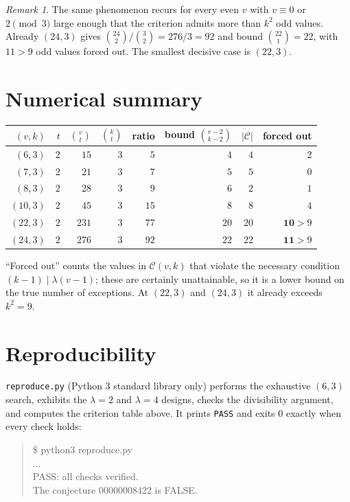 \documentclass[11pt]{article}
\theoremstyle{definition}
\theoremstyle{remark}
\newtheorem{remark}[theorem]{Remark}
\begin{document}
\begin{remark}
The same phenomenon recurs for every even $v$ with $v\equiv 0$ or $2\pmod 3$
large enough that the criterion admits more than $k^{2}$ odd values. Already
$(24,3)$ gives $\binom{24}{2}/\binom{3}{2}=276/3=92$ and bound
$\binom{22}{1}=22$, with $11>9$ odd values forced out. The smallest decisive
case is $(22,3)$.
\end{remark}

\section{Numerical summary}

\begin{center}
\begin{tabular}{r r r r r r r r}
\toprule
$(v,k)$ & $t$ & $\binom{v}{t}$ & $\binom{k}{t}$ & ratio & bound
$\binom{v-2}{k-2}$ & $|\mathcal C|$ & forced out \\
\midrule
$(6,3)$  & $2$ & $15$  & $3$ & $5$  & $4$  & $4$  & $2$ \\
$(7,3)$  & $2$ & $21$  & $3$ & $7$  & $5$  & $5$  & $0$ \\
$(8,3)$  & $2$ & $28$  & $3$ & $9$  & $6$  & $2$  & $1$ \\
$(10,3)$ & $2$ & $45$  & $3$ & $15$ & $8$  & $8$  & $4$ \\
$(22,3)$ & $2$ & $231$ & $3$ & $77$ & $20$ & $20$ & $\mathbf{10}>9$ \\
$(24,3)$ & $2$ & $276$ & $3$ & $92$ & $22$ & $22$ & $\mathbf{11}>9$ \\
\bottomrule
\end{tabular}
\end{center}

``Forced out'' counts the values in $\mathcal C(v,k)$ that violate the
necessary condition $(k-1)\mid\lambda(v-1)$; these are certainly unattainable,
so it is a lower bound on the true number of exceptions. At $(22,3)$ and
$(24,3)$ it already exceeds $k^{2}=9$.

\section{Reproducibility}

\texttt{reproduce.py} (Python 3 standard library only) performs the exhaustive
$(6,3)$ search, exhibits the $\lambda=2$ and $\lambda=4$ designs, checks the
divisibility argument, and computes the criterion table above. It prints
\texttt{PASS} and exits $0$ exactly when every check holds:
\begin{quote}\ttfamily
\$ python3 reproduce.py\\
...\\
PASS: all checks verified.\\
The conjecture 00000008422 is FALSE.
\end{quote}
\end{document}
